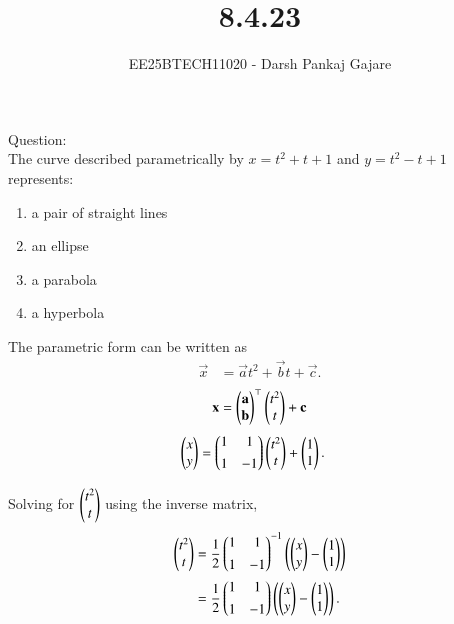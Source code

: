 \documentclass[journal,12pt,onecolumn]{IEEEtran}
\begin{document}
\title{8.4.23}
\author{EE25BTECH11020 - Darsh Pankaj Gajare}
{\let\newpage\relax\maketitle}
Question:\\
The curve described parametrically by $x = t^2 + t + 1$ and $y = t^2 - t + 1$ represents:
\begin{multicols}{4}
\begin{enumerate}
\item a pair of straight lines
\item an ellipse
\item a parabola
\item a hyperbola
\end{enumerate}
\end{multicols}


\solution
\begin{table}[H]
	\centering
	\caption{}
	
	\label{}
\end{table}

The parametric form can be written as
\begin{align}
\vec{x} &= \vec{a}t^2 + \vec{b}t + \vec{c}.
\end{align}
\begin{align}
	\mathbf{x}=\begin{pmatrix}\mathbf{a}\\\mathbf{b}\end{pmatrix}^\top\begin{pmatrix}t^2\\t\end{pmatrix}+\mathbf{c}
\end{align}
\begin{align}
\begin{pmatrix}x\\y\end{pmatrix}
&= 
\begin{pmatrix}1 & 1\\[4pt]1 & -1\end{pmatrix}
\begin{pmatrix}t^2\\t\end{pmatrix} + \begin{pmatrix}1\\1\end{pmatrix}.
\end{align}

Solving for $\begin{pmatrix}t^2\\t\end{pmatrix}$ using the inverse matrix,
\begin{align}
\begin{pmatrix}t^2\\t\end{pmatrix}
&= 
\frac{1}{2}
\begin{pmatrix}1 & 1\\[4pt]1 & -1\end{pmatrix}
^{-1}
\left(\begin{pmatrix}x\\y\end{pmatrix}-\begin{pmatrix}1\\1\end{pmatrix}\right)\\
&= 
\frac{1}{2}
\begin{pmatrix}1 & 1\\[4pt]1 & -1\end{pmatrix}
\left(\begin{pmatrix}x\\y\end{pmatrix}-\begin{pmatrix}1\\1\end{pmatrix}\right).
\end{align}
\end{document}
